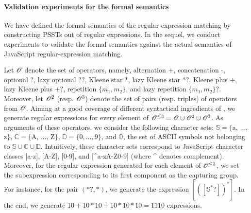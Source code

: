 \paragraph{Validation experiments for the formal semantics} \label{sect：valid}
We have defined the formal semantics of the regular-expression matching by constructing PSSTs out of regular expressions. 
In the sequel, we conduct experiments to validate the formal semantics against the actual semantics of JavaScript regular-expression matching.

Let $\mathscr{O}$ denote the set of {\regexp} operators, namely, alternation $+$, concatenation $\cdot$, optional $?$, lazy optional $??$, Kleene star $*$, lazy Kleene star $*?$, Kleene plus $+$, lazy Kleene plus $+?$, repetition $\{m_1,m_2\}$, and lazy repetition $\{m_1,m_2\}?$. Moreover, let $\mathscr{O}^{2}$ (resp. $\mathscr{O}^{3}$) denote the set of pairs (resp. triples) of operators from $\mathscr{O}$. 
Aiming at a good coverage of different syntactical ingredients of {\regexp}, we generate regular expressions for every element of $\mathscr{O}^{\le 3} = \mathscr{O} \cup \mathscr{O}^2 \cup \mathscr{O}^3$.
As arguments of these operators, we consider the following character sets: $\mathbb{S} = \{$a, $\ldots$, z$\}$, $\mathbb{C}=\{$A, $\ldots$, Z$\}$, $\mathbb{D} = \{0,\ldots,9\}$, and $\mathbb{O}$, the set of ASCII symbols not belonging to $\mathbb{S} \cup \mathbb{C} \cup \mathbb{D}$.
Intuitively, these character sets correspond to JavaScript character classes [a-z], [A-Z], [0-9], and [{\textasciicircum}a-zA-Z0-9] (where {\textasciicircum} denotes complement).
Moreover, for the regular expression generated for each element of $\mathscr{O}^{\le 3}$, we set the subexpression corresponding to its first component as the capturing group. 
For instance, for the pair $(*?, *)$, we generate the {\regexp} expression $[([\mathbb{S}^*?])^{*}]$. In the end, we generate $10+10*10+10*10*10 = 1110$ {\regexp} expressions. 

